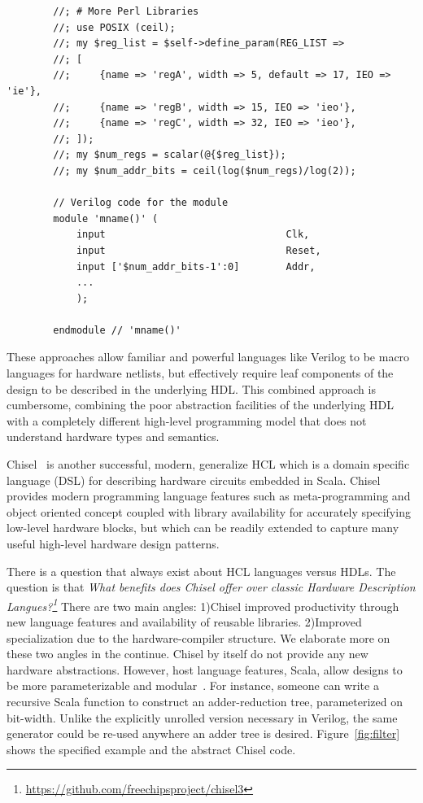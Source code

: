 \begin{listing}[ht]
    \begin{verbatim}
        //; # More Perl Libraries
        //; use POSIX (ceil);
        //; my $reg_list = $self->define_param(REG_LIST => 
        //; [	
        //;     {name => 'regA', width => 5, default => 17, IEO => 'ie'},
        //;     {name => 'regB', width => 15, IEO => 'ieo'},
        //;     {name => 'regC', width => 32, IEO => 'ieo'},
        //; ]);
        //; my $num_regs = scalar(@{$reg_list});
        //; my $num_addr_bits = ceil(log($num_regs)/log(2));

        // Verilog code for the module
        module 'mname()' (
            input                               Clk,
            input                               Reset,
            input ['$num_addr_bits-1':0]        Addr,
            ...
            );

        endmodule // 'mname()'
    \end{verbatim}
    \caption[Caption for LOF]%
    {Genesis2 code example, combining SystemVerilog and Perl~\cite{genesis2}}
    \label{listing:genesis2}
\end{listing}


These approaches allow familiar and powerful languages like Verilog to be macro languages for hardware netlists, but effectively require leaf components of the design to be described in the underlying HDL.
This combined approach is cumbersome, combining the poor abstraction facilities of the underlying HDL with a completely different high-level programming model that does not understand hardware types and semantics.

Chisel~\cite{chisel} is another successful, modern, generalize HCL which is a domain specific language (DSL) for describing hardware circuits embedded in Scala.
Chisel provides modern programming language features such as meta-programming and object oriented concept coupled with library availability for accurately specifying low-level hardware blocks, but which can be readily extended to capture many useful high-level hardware design patterns.

There is a question that always exist about HCL languages versus HDLs. The question is that \emph{What benefits does Chisel offer over classic Hardware Description Langues?\footnote{\url{https://github.com/freechipsproject/chisel3}}}
There are two main angles: 1)Chisel improved productivity through new language features and availability of reusable libraries. 2)Improved specialization due to the hardware-compiler structure. We elaborate more on these two angles in the continue.
Chisel by itself do not provide any new hardware abstractions. However, host language features, Scala, allow designs to be more parameterizable and modular~\cite{izraelevitz_2017_firrtl_reusability}.
For instance,  someone can write a recursive Scala function to construct an adder-reduction tree, parameterized on bit-width.
Unlike the explicitly unrolled version necessary in Verilog, the same generator could be re-used anywhere an adder tree is desired.
Figure~\ref{fig:filter} shows the specified example and the abstract Chisel code.

